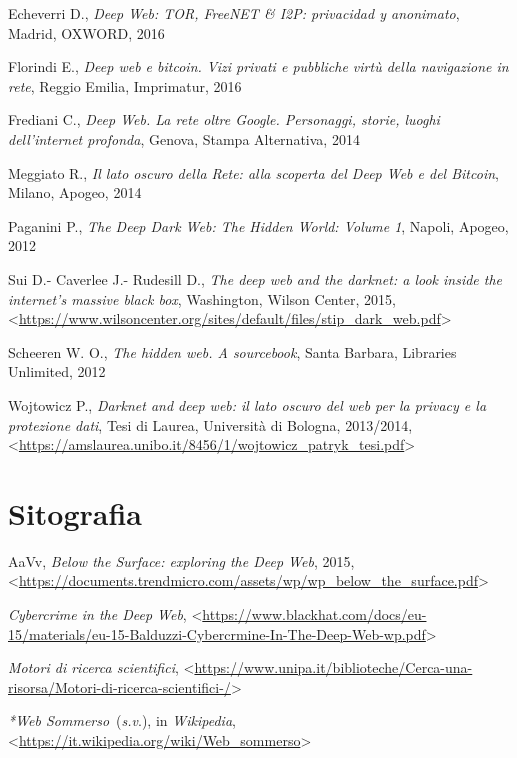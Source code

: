 \documentclass[
  b5paper,
  twoside,
  11pt,
  chapterprefix=false,
  bibliography=totocnumbered,
  listof=flat]{scrbook}
\begin{document}
Echeverri D., \emph{Deep Web: TOR, FreeNET \& I2P: privacidad y anonimato},
Madrid, OXWORD, 2016

Florindi E., \emph{Deep web e bitcoin. Vizi privati e pubbliche virtù della
navigazione in rete}, Reggio Emilia, Imprimatur, 2016

Frediani C., \emph{Deep Web. La rete oltre Google. Personaggi, storie, luoghi
dell'internet profonda}, Genova, Stampa Alternativa, 2014

Meggiato R., \emph{Il lato oscuro della Rete: alla scoperta del Deep Web e
del Bitcoin}, Milano, Apogeo, 2014

Paganini P., \emph{The Deep Dark Web: The Hidden World: Volume 1}, Napoli,
Apogeo, 2012

Sui D.- Caverlee J.- Rudesill D., \emph{The deep web and the darknet: a look
inside the internet's massive black box}, Washington, Wilson Center,
2015,
\textless{}\href{https://www.wilsoncenter.org/sites/default/files/stip_dark_web.pdf}{{https://www.wilsoncenter.org/sites/default/files/stip\_dark\_web.pdf}}\textgreater{}

Scheeren W. O., \emph{The hidden web. A sourcebook}, Santa Barbara, Libraries
Unlimited, 2012

Wojtowicz P., \emph{Darknet and deep web: il lato oscuro del web per la
privacy e la protezione dati}, Tesi di Laurea, Università di Bologna,
2013/2014,
\textless{}{\url{https://amslaurea.unibo.it/8456/1/wojtowicz_patryk_tesi.pdf}\textgreater{}}

\hypertarget{sitografia-14}{%
\section*{Sitografia}\label{sitografia-14}}

AaVv, \emph{Below the Surface: exploring the Deep Web}, 2015,
\textless{}\href{https://documents.trendmicro.com/assets/wp/wp_below_the_surface.pdf}{{https://documents.trendmicro.com/assets/wp/wp\_below\_the\_surface.pdf}}\textgreater{}

\emph{Cybercrime in the Deep Web},
\textless{}{\url{https://www.blackhat.com/docs/eu-15/materials/eu-15-Balduzzi-Cybercrmine-In-The-Deep-Web-wp.pdf}\textgreater{}}

\emph{Motori di ricerca scientifici},
\textless{}{\url{https://www.unipa.it/biblioteche/Cerca-una-risorsa/Motori-di-ricerca-scientifici-/}\textgreater{}}

\emph{*Web Sommerso}~(\emph{s.v}.), in \emph{Wikipedia},
\textless{}\href{https://it.wikipedia.org/wiki/Web_sommerso}{{https://it.wikipedia.org/wiki/Web\_sommerso}}\textgreater{}
\end{document}
